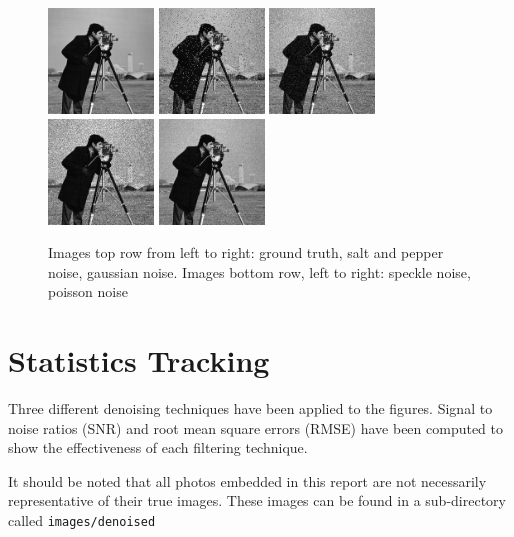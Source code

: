 \documentclass{article}
\begin{document}
\begin{figure}[t]
  \centering
  \includegraphics[width=0.25\textwidth]{images/camera_truth}
  \includegraphics[width=0.25\textwidth]{images/camera_noisy1}
  \includegraphics[width=0.25\textwidth]{images/camera_noisy2}
  \includegraphics[width=0.25\textwidth]{images/camera_noisy3}
  \includegraphics[width=0.25\textwidth]{images/camera_noisy4}
  \caption{Images top row from left to right: ground truth, salt and pepper
    noise, gaussian noise. Images bottom row, left to right: speckle noise, poisson noise}
  \label{fig:noisy-cam}
\end{figure}   
% 
\section{Statistics Tracking}
\label{sec:stats-tracking}
% 
Three different denoising techniques have been applied to the
figures. Signal to noise ratios (SNR) and root mean
square errors (RMSE) have been computed to show the effectiveness of each
filtering technique. \par
%
It should be noted that all photos embedded in this report are not
necessarily representative of their true images. These images can be
found in a sub-directory called \texttt{images/denoised}
% 
\end{document}
